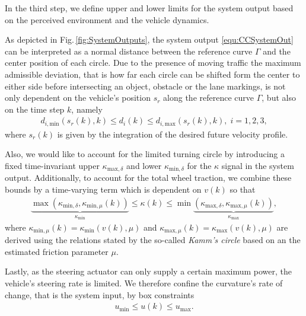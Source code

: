 In the third step, we define upper and lower limits for the system output based on the perceived environment and the vehicle dynamics. 

As depicted in Fig.\,\ref{fig:SystemOutputs}, the system output \eqref{equ:CCSystemOut} can be interpreted as a normal distance between the reference curve $\Gamma$ and the center position of each circle. 
Due to the presence of moving traffic the maximum admissible deviation, that is how far each circle can be shifted form the center to either side before intersecting an object, obstacle or the lane markings, is not only dependent on the vehicle's position $s_r$ along the reference curve $\Gamma$, but also on the time step $k$, namely
\begin{align}
	d_{i,\text{min}}\left(s_r(k),k\right) \leq d_i(k) \leq d_{i,\text{max}}\left(s_r(k),k\right), \; i = 1,2,3,
	\label{equ:ColAvoiConstraint}
\end{align}
where $s_r(k)$ is given by the integration of the desired future velocity profile.


Also, we would like to account for the limited turning circle by introducing a fixed time-invariant upper $\kappa_{\text{max},\delta}$ and lower $\kappa_{\text{min},\delta}$ for the $\kappa$ signal in the system output. Additionally, to account for the total wheel traction, we combine these bounds by a time-varying term which is dependent on $v(k)$ so that
\begin{align}
	\underbrace{\max \left(\kappa_{\text{min},\delta},\kappa_{\text{min},\mu}(k)\right)}_{\kappa_{\text{min}}} \leq \kappa(k) \leq \min \underbrace{\left(\kappa_{\text{max},\delta},\kappa_{\text{max},\mu}(k)\right)}_{\kappa_{\text{max}}},
	\label{equ:KappaConstraint}
\end{align}
where $\kappa_{\text{min},\mu}(k) = \kappa_{\text{min}}\left(v(k),\mu\right)$ and $\kappa_{\text{max},\mu}(k) = \kappa_{\text{max}}\left(v(k),\mu\right)$ are derived using the relations stated by the so-called \emph{Kamm's circle} based on an the estimated friction parameter $\mu$.

Lastly, as the steering actuator can only supply a certain maximum power, the vehicle's steering rate is limited. We therefore confine the curvature's rate of change, that is the system input, by box constraints
\begin{align}
	u_{\text{min}} \leq u(k) \leq u_{\text{max}}.
	\label{equ:InputConstraint}
\end{align}

